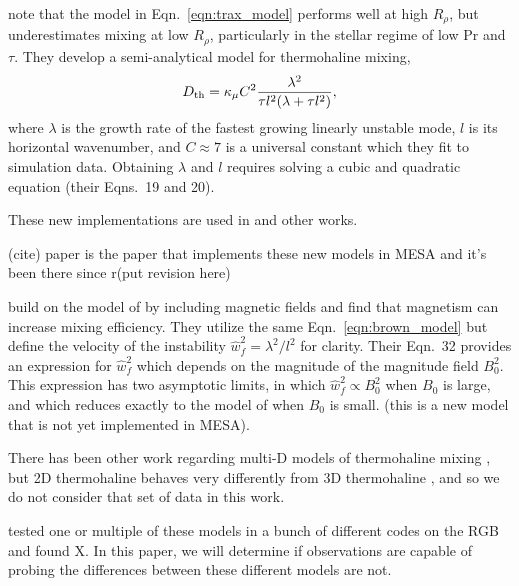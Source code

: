 \citet{brown_etal_2013} note that the model in Eqn.~\ref{eqn:trax_model} performs well at high $R_\rho$, but underestimates mixing at low $R_\rho$, particularly in the stellar regime of low Pr and $\tau$.
They develop a semi-analytical model for thermohaline mixing,
\begin{equation}
    \Dth = \kappa_{\mu}C^2\frac{\lambda^2}{\tau l^2(\lambda + \tau l^2)},
    \label{eqn:brown_model}
\end{equation}
where $\lambda$ is the growth rate of the fastest growing linearly unstable mode, $l$ is its horizontal wavenumber, and $C \approx 7$ is a universal constant which they fit to simulation data.
Obtaining $\lambda$ and $l$ requires solving a cubic and quadratic equation (their Eqns.~19 and 20).

These new implementations are used in \citep{bauer_bildsten_2019} and other works.

(cite) paper is the paper that implements these new models in MESA and it's been there since r(put revision here)


\citet{harrington} build on the model of \citet{brown_etal_2013} by including magnetic fields and find that magnetism can increase mixing efficiency.
They utilize the same Eqn.~\ref{eqn:brown_model} but define the velocity of the instability $\hat{w}_f^2 = \lambda^2/l^2$ for clarity. 
Their Eqn.~32 provides an expression for $\hat{w}_f^2$ which depends on the magnitude of the magnitude field $B_0^2$.
This expression has two asymptotic limits, in which $\hat{w}_f^2 \propto B_0^2$ when $B_0$ is large, and which reduces exactly to the model of \citet{brown_etal_2013} when $B_0$ is small.
(this is a new model that is not yet implemented in MESA).


There has been other work regarding multi-D models of thermohaline mixing \citep{denissenkov_2010, denissenkov_merryfield_2011}, but 2D thermohaline behaves very differently from 3D thermohaline \citep{garaud_brummell_2015}, and so we do not consider that set of data in this work.

\citet{lattanzio_etal_2015} tested one or multiple of these models in a bunch of different codes on the RGB and found X.
In this paper, we will determine if observations are capable of probing the differences between these different models are not.

